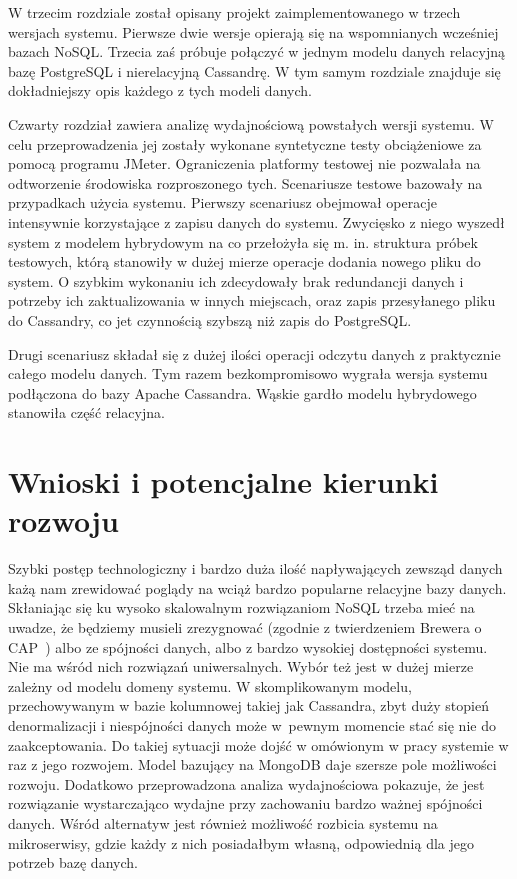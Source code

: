 W trzecim rozdziale został opisany projekt zaimplementowanego w trzech wersjach systemu.
Pierwsze dwie wersje opierają się na wspomnianych wcześniej bazach NoSQL.
Trzecia zaś próbuje połączyć w jednym modelu danych relacyjną bazę PostgreSQL i nierelacyjną Cassandrę.
W tym samym rozdziale znajduje się dokładniejszy opis każdego z tych modeli danych.

Czwarty rozdział zawiera analizę wydajnościową powstałych wersji systemu.
W celu przeprowadzenia jej zostały wykonane syntetyczne testy obciążeniowe za pomocą programu JMeter.
Ograniczenia platformy testowej nie pozwalała na odtworzenie środowiska rozproszonego tych.
Scenariusze testowe bazowały na przypadkach użycia systemu.
Pierwszy scenariusz obejmował operacje intensywnie korzystające z zapisu danych do systemu.
Zwycięsko z niego wyszedł system z modelem hybrydowym na co przełożyła się m. in. struktura próbek testowych, którą stanowiły w dużej mierze operacje dodania nowego pliku do system.
O szybkim wykonaniu ich zdecydowały brak redundancji danych i potrzeby ich zaktualizowania w innych miejscach, oraz zapis przesyłanego pliku do Cassandry, co jet czynnością szybszą niż zapis do PostgreSQL.

Drugi scenariusz składał się z dużej ilości operacji odczytu danych z praktycznie całego modelu danych.
Tym razem bezkompromisowo wygrała wersja systemu podłączona do bazy Apache Cassandra.
Wąskie gardło modelu hybrydowego stanowiła część relacyjna.

\section*{Wnioski i potencjalne kierunki rozwoju}

Szybki postęp technologiczny i bardzo duża ilość napływających zewsząd danych każą nam zrewidować poglądy na wciąż bardzo popularne relacyjne bazy danych.
Skłaniając się ku wysoko skalowalnym rozwiązaniom NoSQL trzeba mieć na uwadze, że będziemy musieli zrezygnować (zgodnie z twierdzeniem Brewera o CAP~\cite{BrewerTheorem}) albo ze spójności danych, albo z bardzo wysokiej dostępności systemu.
Nie ma wśród nich rozwiązań uniwersalnych.
Wybór też jest w dużej mierze zależny od modelu domeny systemu. 
W skomplikowanym modelu, przechowywanym w bazie kolumnowej takiej jak Cassandra, zbyt duży stopień denormalizacji i niespójności danych może w~pewnym momencie stać się nie do zaakceptowania.
Do takiej sytuacji może dojść w omówionym w pracy systemie w raz z jego rozwojem.
Model bazujący na MongoDB daje szersze pole możliwości rozwoju.
Dodatkowo przeprowadzona analiza wydajnościowa pokazuje, że jest rozwiązanie wystarczająco wydajne przy zachowaniu bardzo ważnej spójności danych.
Wśród alternatyw jest również możliwość rozbicia systemu na mikroserwisy, gdzie każdy z nich posiadałbym własną, odpowiednią dla jego potrzeb bazę danych.
